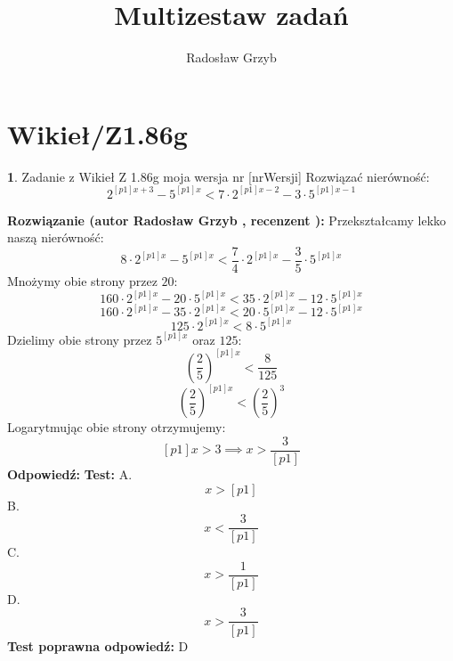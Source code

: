 \documentclass[12pt, a4paper]{article}
\title{Multizestaw zadań}
\author{Radosław Grzyb}
\date{}
\theoremstyle{definition} %
\newtheorem{zad}{}
\newcommand{\kategoria}[1]{\section{#1}} %
\newcommand{\zadStart}[1]{\begin{zad}#1\newline} %
\newcommand{\zadStop}{\end{zad}}   %
\newcommand{\rozwStart}[2]{\noindent \textbf{Rozwiązanie (autor #1 , recenzent #2): }\newline} %
\newcommand{\rozwStop}{\newline}                                            %
\newcommand{\odpStart}{\noindent \textbf{Odpowiedź:}\newline}    %
\newcommand{\odpStop}{\newline}                                             %
\newcommand{\testStart}{\noindent \textbf{Test:}\newline} %
\newcommand{\testStop}{\newline} %
\newcommand{\kluczStart}{\noindent \textbf{Test poprawna odpowiedź:}\newline} %
\newcommand{\kluczStop}{\newline} %
\begin{document}
\maketitle
\kategoria{Wikieł/Z1.86g}
\zadStart{Zadanie z Wikieł Z 1.86g moja wersja nr [nrWersji]}
Rozwiązać nierówność:
$$2^{[p1]x+3}-5^{[p1]x}<7\cdot2^{[p1]x-2}-3\cdot5^{[p1]x-1}$$
\zadStop
\rozwStart{Radosław Grzyb}{}
Przekształcamy lekko naszą nierówność:
$$8\cdot2^{[p1]x}-5^{[p1]x}<\frac{7}{4}\cdot2^{[p1]x}-\frac{3}{5}\cdot5^{[p1]x}$$
Mnożymy obie strony przez $20$:
$$160\cdot2^{[p1]x}-20\cdot5^{[p1]x}<35\cdot2^{[p1]x}-12\cdot5^{[p1]x}$$
$$160\cdot2^{[p1]x}-35\cdot2^{[p1]x}<20\cdot5^{[p1]x}-12\cdot5^{[p1]x}$$
$$125\cdot2^{[p1]x}<8\cdot5^{[p1]x}$$
Dzielimy obie strony przez $5^{[p1]x}$ oraz $125$:
$$\left(\frac{2}{5}\right)^{[p1]x}<\frac{8}{125}$$ 
$$\left(\frac{2}{5}\right)^{[p1]x}<\left(\frac{2}{5}\right)^3$$
Logarytmując obie strony otrzymujemy:
$$[p1]x>3\implies x>\frac{3}{[p1]}$$
\rozwStop
\odpStart
\odpStop
\testStart
A.$$x>[p1]$$
B.$$x<\frac{3}{[p1]}$$
C.$$x>\frac{1}{[p1]}$$
D.$$x>\frac{3}{[p1]}$$
\testStop
\kluczStart
D
\kluczStop
\end{document}

